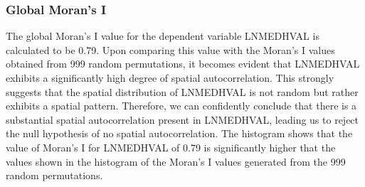 \documentclass[
]{article}
\begin{document}
\hypertarget{global-morans-i}{%
\subsubsection{Global Moran's I}\label{global-morans-i}}

The global Moran's I value for the dependent variable LNMEDHVAL is
calculated to be 0.79. Upon comparing this value with the Moran's I
values obtained from 999 random permutations, it becomes evident that
LNMEDHVAL exhibits a significantly high degree of spatial
autocorrelation. This strongly suggests that the spatial distribution of
LNMEDHVAL is not random but rather exhibits a spatial pattern.
Therefore, we can confidently conclude that there is a substantial
spatial autocorrelation present in LNMEDHVAL, leading us to reject the
null hypothesis of no spatial autocorrelation. The histogram shows that
the value of Moran's I for LNMEDHVAL of 0.79 is significantly higher
that the values shown in the histogram of the Moran's I values generated
from the 999 random permutations.
\end{document}

